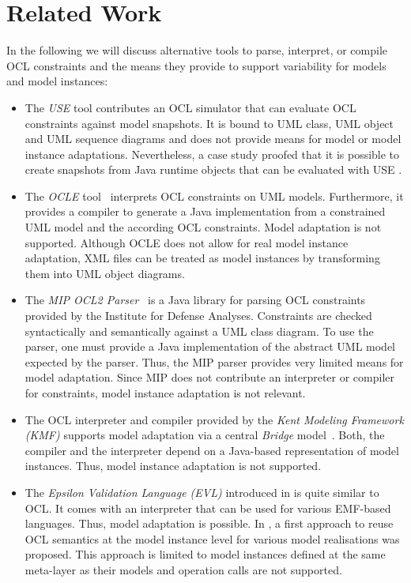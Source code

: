 \section{Related Work}
\label{sec:relatedWork}
In the following we will discuss alternative tools to parse,
interpret, or compile OCL constraints and the means they provide
to support variability for models and model instances:

\begin{itemize}
  
\item The \emph{USE} tool \cite{gogolla2007use} contributes an OCL simulator that can
evaluate OCL constraints against model snapshots. It is bound to UML class, UML object and
UML sequence diagrams and does not provide means for model or model instance
adaptations. Nevertheless, a case study proofed that it is possible to create snapshots
from Java runtime objects that can be evaluated with USE \cite{occello:ICSTW08}.

\item The \emph{OCLE} tool~\cite{WWW:OCLE} interprets OCL constraints on
UML models. Furthermore, it provides a compiler to generate a Java
implementation from a constrained UML model and the according OCL 
constraints. Model adaptation is not supported. Although OCLE does not allow for
real model instance adaptation, XML files can be treated as model instances by
transforming them into UML object diagrams.

\item The \emph{MIP OCL2 Parser}~\cite{WWW:MIP} is a Java library for parsing OCL
constraints provided by the Institute for Defense Analyses. Constraints are
checked syntactically and semantically against a UML class diagram.
To use the parser, one must provide a Java implementation of the abstract 
UML model expected by the parser. Thus,
the MIP parser provides very limited means for model adaptation. Since MIP does
not contribute an interpreter or compiler for constraints, model
instance adaptation is not relevant.

\item The OCL interpreter and compiler provided by the \emph{Kent Modeling Framework
(KMF)} supports model adaptation via a central \emph{Bridge}
model~\cite{akehurst2003ocl}. Both, the compiler and the interpreter depend on a
Java-based representation of model instances. Thus, model instance adaptation is not
supported.

\item The \emph{Epsilon Validation Language (EVL)} introduced in
\cite{kolovos2008detecting} is quite similar to OCL. It comes with an
interpreter that can be used for various EMF-based languages. Thus, model
adaptation is possible.
In \cite{kolovos2006queries}, a first approach to reuse OCL semantics at the model instance level
for various model realisations was proposed. This approach is limited to model
instances defined at the same meta-layer as their models and operation calls are not supported.
 

\end{itemize}
